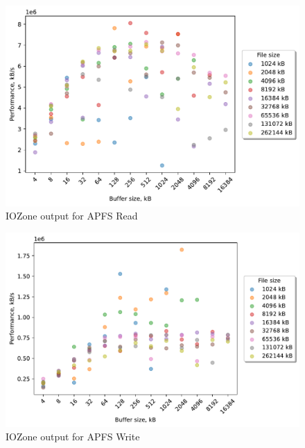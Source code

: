 \begin{figure}[!htb]
	\label{fig:bench_apfs_read}
	\begin{center}
		\includegraphics[width=1.0\textwidth]{figures/benchmarking/local/Read.pdf}
	\end{center}
	\caption{IOZone output for \gls{APFS} Read}
\end{figure}

\begin{figure}[!htb]
	\label{fig:bench_apfs_write}
	\begin{center}
		\includegraphics[width=1.0\textwidth]{figures/benchmarking/local/Write.pdf}
	\end{center}
	\caption{IOZone output for \gls{APFS} Write}
\end{figure}

